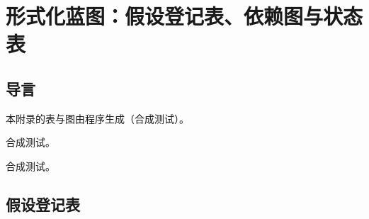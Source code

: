 \chapter{形式化蓝图：假设登记表、依赖图与状态表}\label{app:appP}

\section{导言}\label{sec:appP-intro}

本附录的表与图由程序生成（合成测试）。

\begin{definition}[内容等级]\label{def:appP-content-grade}
合成测试。
\end{definition}

\begin{remark}\label{rem:appP-limits}
合成测试。
\end{remark}


\section{假设登记表}\label{sec:appP-register}
